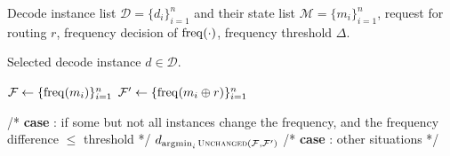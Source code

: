 \begin{algorithm}[!ht]
 \caption{\router: Decode Request Routing}
 \label{alg:ecoroute}
 \begin{algorithmic}[1]

    \Require Decode instance list $\mathcal{D}=\{d_i\}_{i=1}^n$ and their state list $\mathcal{M}=\{m_i\}_{i=1}^n$, request for routing $r$, frequency decision of \governor $\operatorname{freq}(\cdot)$, frequency threshold $\Delta$.

    \Ensure Selected decode instance $d\in\mathcal{D}$.

    \State $\mathcal{F} \gets \{ \operatorname{freq}(m_i)\}_{i=1}^n$ 
    \State $\mathcal{F}^\prime \gets \{ \operatorname{freq}(m_i \oplus r)\}_{i=1}^n$ 

        \Statex /* \textbf{case} : if some but not all instances change the frequency, and the frequency difference $\le$ threshold */
        \State \Return $d_{\argmin_i \Call{Unchanged}{\mathcal{F}, \mathcal{F}^\prime}}$ 
    \EndIf
    \Statex /* \textbf{case} : other situations */
    \State \Return {} 


 \end{algorithmic}
\end{algorithm}

